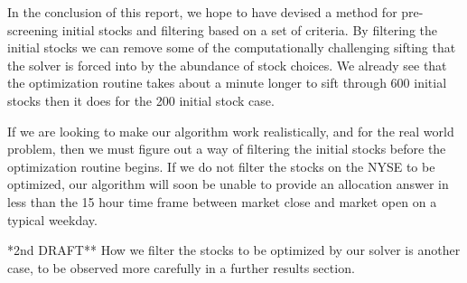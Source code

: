 In the conclusion of this report, we hope to have devised a method for pre-screening initial stocks and filtering based on a set of criteria.  By filtering the initial stocks we can remove some of the computationally challenging sifting that the solver is forced into by the abundance of stock choices.  We already see that the optimization routine takes about a minute longer to sift through 600 initial stocks then it does for the 200 initial stock case.  

If we are looking to make our algorithm work realistically, and for the real world problem, then we must figure out a way of filtering the initial stocks before the optimization routine begins.  If we do not filter the stocks on the NYSE to be optimized, our algorithm will soon be unable to provide an allocation answer in less than the 15 hour time frame between market close and market open on a typical weekday.  

\noindent **2nd DRAFT** How we filter the stocks to be optimized by our solver is another case, to be observed more carefully in a further results section.  
















